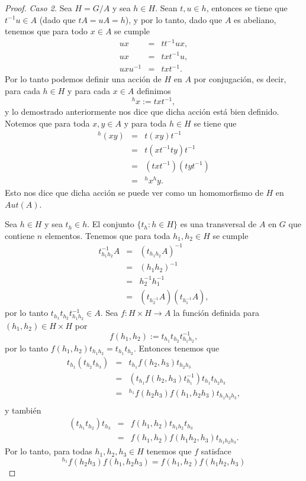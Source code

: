 \begin{proof}
    \textit{Caso 2. }
    Sea $H=G/A$ y sea $h\in H$. Sean $t, u\in h$, entonces se tiene que $t^{-1}u\in A$ (dado que $tA = uA = h$), y por lo tanto, dado que $A$ es abeliano, tenemos que para todo $x\in A$ se cumple 
    \begin{eqnarray*}
	ux &		=&	tt^{-1}ux,	\\ 
	ux &		=&	txt^{-1}u, 	\\
	uxu^{-1} &	=&	 txt^{-1}.	
    \end{eqnarray*}
    Por lo tanto podemos definir una acci\'on de $H$ en $A$ por conjugaci\'on, es decir, para cada $h\in H$ y para cada $x\in A$ definimos 
    \[{}^{h}x := txt^{-1},\]
    y lo demostrado anteriormente nos dice que dicha acci\'on est\'a bien definido. Notemos que para toda $x, y\in A$ y para toda $h\in H$ se tiene que 
    \begin{eqnarray*}
	{}^h(xy) &		=&	t(xy)t^{-1}	\\
		&	=&	t(xt^{-1}ty)t^{-1}	\\
		&	=&	(txt^{-1})(tyt^{-1})	\\
		&	=&	{}^hx{}^hy.
    \end{eqnarray*}
    Esto nos dice que dicha acci\'on se puede ver como un homomorfismo de $H$ en $Aut(A)$.
    
    Sea $h\in H$ y sea $t_h\in h$. El conjunto $\{t_h : h\in H\}$ es una transversal de $A$ en $G$ que contiene $n$ elementos. Tenemos que para toda $h_1, h_2\in H$ se cumple
    \begin{eqnarray*}
	t^{-1}_{h_1h_2}A &	=&	(t_{h_1h_2}A)^{-1}	\\
			 &	=&	(h_1h_2)^{-1}		\\
			&	=&	h_2^{-1}h_1^{-1} 	\\
			&	=&	(t_{h_2^{-1}}A)(t_{h_1^{-1}}A),
    \end{eqnarray*}
    por lo tanto $t_{h_1}t_{h_2}t^{-1}_{h_1h_2}\in A$. Sea $f:H\times H\rightarrow A$ la funci\'on definida para $(h_1, h_2)\in H\times H$ por
    \[f(h_1, h_2) := t_{h_1}t_{h_2}t^{-1}_{h_1h_2},\]
    por lo tanto $f(h_1, h_2)t_{h_1h_2} = t_{h_1}t_{h_2}$. Entonces tenemos que
    \begin{eqnarray*}
	t_{h_1}(t_{h_2}t_{h_3}) & 	=&	t_{h_1}f(h_2, h_3)t_{h_2h_3}	\\
				&	=&	(t_{h_1}f(h_2, h_3)t_{h_1}^{-1})t_{h_1}t_{h_2h_3}	\\
				&	=&	{}^{h_1}f(h_2h_3)f(h_1, h_2h_3)t_{h_1h_2h_3},	\\
    \end{eqnarray*}
    y también
    \begin{eqnarray*}
     (t_{h_1}t_{h_2})t_{h_3}& 		=&	f(h_1, h_2)t_{h_1h_2}t_{h_3} \\
			      &		=&	f(h_1, h_2)f(h_1h_2, h_3)t_{h_1h_2h_3}.
    \end{eqnarray*}
    Por lo tanto, para todas $h_1, h_2, h_3\in H$ tenemos que $f$ satisface
    \begin{equation}
	\label{cocycle}
	{}^{h_1}f(h_2h_3)f(h_1, h_2h_3) = f(h_1, h_2)f(h_1h_2, h_3)
    \end{equation}
    

\end{proof}
